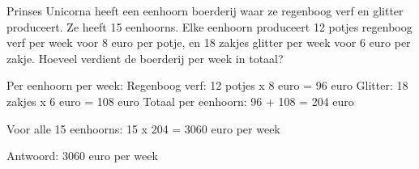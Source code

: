 \begin{opgave}
Prinses Unicorna heeft een eenhoorn boerderij waar ze regenboog verf en 
glitter produceert. Ze heeft 15 eenhoorns. Elke eenhoorn produceert 12 potjes 
regenboog verf per week voor 8 euro per potje, en 18 zakjes glitter per week 
voor 6 euro per zakje. Hoeveel verdient de boerderij per week in totaal?
\end{opgave}

\begin{oplossing}
Per eenhoorn per week:
Regenboog verf: 12 potjes x 8 euro = 96 euro
Glitter: 18 zakjes x 6 euro = 108 euro
Totaal per eenhoorn: 96 + 108 = 204 euro

Voor alle 15 eenhoorns:
15 x 204 = 3060 euro per week

Antwoord: 3060 euro per week
\end{oplossing}